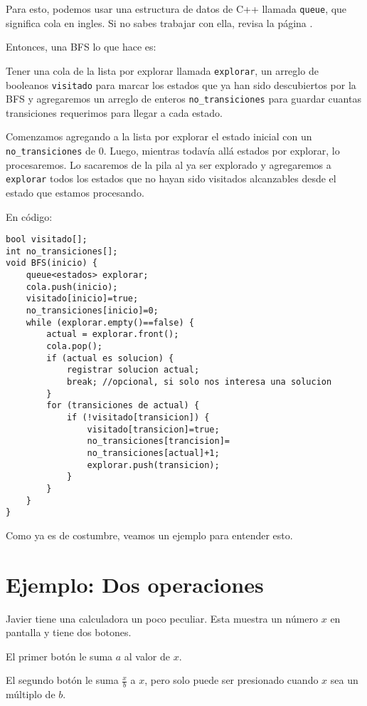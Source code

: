 Para esto, podemos usar una estructura de datos de C++ llamada \verb|queue|, que significa cola en ingles. Si no sabes trabajar con ella, revisa la página \pageref{queue}.

Entonces, una BFS lo que hace es:

Tener una cola de la lista por explorar llamada \verb|explorar|, un arreglo de booleanos \verb|visitado| para marcar los estados que ya han sido descubiertos por la BFS y agregaremos un arreglo de enteros \verb|no_transiciones| para guardar cuantas transiciones requerimos para llegar a cada estado.

Comenzamos agregando a la lista por explorar el estado inicial con un \verb|no_transiciones| de \(0\). Luego, mientras todavía allá estados por explorar, lo procesaremos. Lo sacaremos de la pila al ya ser explorado y agregaremos a \verb|explorar| todos los estados que no hayan sido visitados alcanzables desde el estado que estamos procesando.

En código:

\begin{minipage}{\linewidth}
\begin{lstlisting}
bool visitado[];
int no_transiciones[];
void BFS(inicio) {
	queue<estados> explorar;
	cola.push(inicio);
	visitado[inicio]=true;
	no_transiciones[inicio]=0;
	while (explorar.empty()==false) {
		actual = explorar.front();
		cola.pop();
		if (actual es solucion) {
			registrar solucion actual;
			break; //opcional, si solo nos interesa una solucion
		}
		for (transiciones de actual) {
			if (!visitado[transicion]) {
				visitado[transicion]=true;
				no_transiciones[trancision]=
				no_transiciones[actual]+1;
				explorar.push(transicion);
			}
		}
	}
}
\end{lstlisting}
\end{minipage}

Como ya es de costumbre, veamos un ejemplo para entender esto.
\section*{Ejemplo: Dos operaciones}
Javier tiene una calculadora un poco peculiar. Esta muestra un número \(x\) en pantalla y tiene dos botones.

\begin{plimits}
	\item El primer botón le suma \(a\) al valor de \(x\).
	\item El segundo botón le  suma \(\frac{x}{b}\) a \(x\), pero solo puede ser presionado cuando \(x\) sea un múltiplo de \(b\).
\end{plimits}

